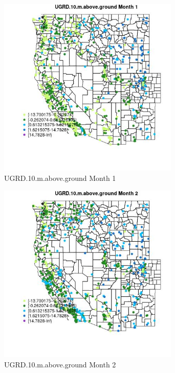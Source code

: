 \begin{figure} 
\centering  
\includegraphics[width=0.77\textwidth]{Code_Outputs/Report_ML_input_PM25_Step4_part_f_de_duplicated_aves_prioritize_24hr_obswNAs_MapObsMo1UGRD10maboveground.jpg} 
\caption{\label{fig:Report_ML_input_PM25_Step4_part_f_de_duplicated_aves_prioritize_24hr_obswNAsMapObsMo1UGRD10maboveground}UGRD.10.m.above.ground Month 1} 
\end{figure} 
 

\begin{figure} 
\centering  
\includegraphics[width=0.77\textwidth]{Code_Outputs/Report_ML_input_PM25_Step4_part_f_de_duplicated_aves_prioritize_24hr_obswNAs_MapObsMo2UGRD10maboveground.jpg} 
\caption{\label{fig:Report_ML_input_PM25_Step4_part_f_de_duplicated_aves_prioritize_24hr_obswNAsMapObsMo2UGRD10maboveground}UGRD.10.m.above.ground Month 2} 
\end{figure} 
 

